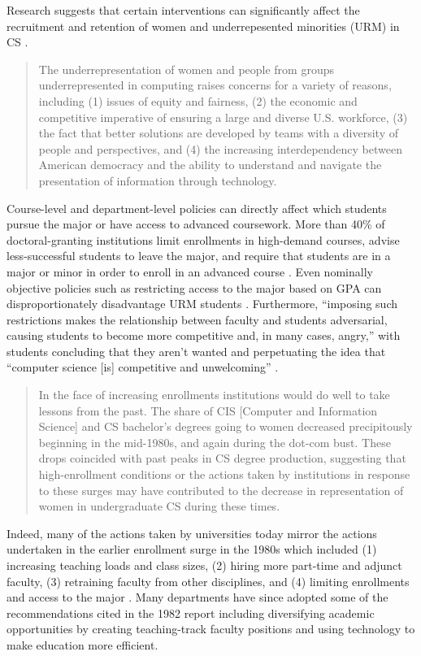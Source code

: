 Research suggests that certain interventions can significantly affect the recruitment and retention of women and underrepesented minorities (URM) in CS \cite{Cohoon:2002, Babes-Vroman:2017, Rheingans:2018, Newhall:2014, Narayanan:2018, Lewis:2017, GenerationCS, RetentionCS, CSUndergraduateEnrollments, DiversityGapsCS}.
\begin{quote}
    The underrepresentation of women and people from groups underrepresented in computing raises concerns for a variety of reasons, including (1) issues of equity and fairness, (2) the economic and competitive imperative of ensuring a large and diverse U.S. workforce, (3) the fact that better solutions are developed by teams with a diversity of people and perspectives, and (4) the increasing interdependency between American democracy and the ability to understand and navigate the presentation of information through technology. \cite{RetentionCS}
\end{quote}
Course-level and department-level policies can directly affect which students pursue the major or have access to advanced coursework. More than 40\% of doctoral-granting institutions limit enrollments in high-demand courses, advise less-successful students to leave the major, and require that students are in a major or minor in order to enroll in an advanced course \cite{GenerationCS}. Even nominally objective policies such as restricting access to the major based on GPA can disproportionately disadvantage URM students \cite{DiversityGapsCS, RetentionCS}. Furthermore, ``imposing such restrictions makes the relationship between faculty and students adversarial, causing students to become more competitive and, in many cases, angry,'' with students concluding that they aren't wanted and perpetuating the idea that ``computer science [is] competitive and unwelcoming'' \cite{Roberts:2016, Patitsas:2014, Patitsas:2016}.

\begin{quote}
    In the face of increasing enrollments institutions would do well to take lessons from the past. The share of CIS [Computer and Information Science] and CS bachelor's degrees going to women decreased precipitously beginning in the mid-1980s, and again during the dot-com bust. These drops coincided with past peaks in CS degree production, suggesting that high-enrollment conditions or the actions taken by institutions in response to these surges may have contributed to the decrease in representation of women in undergraduate CS during these times. \cite{CSUndergraduateEnrollments}
\end{quote}
Indeed, many of the actions taken by universities today mirror the actions undertaken in the earlier enrollment surge in the 1980s which included (1) increasing teaching loads and class sizes, (2) hiring more part-time and adjunct faculty, (3) retraining faculty from other disciplines, and (4) limiting enrollments and access to the major \cite{Curtis:1982}. Many departments have since adopted some of the recommendations cited in the 1982 report including diversifying academic opportunities by creating teaching-track faculty positions and using technology to make education more efficient.


